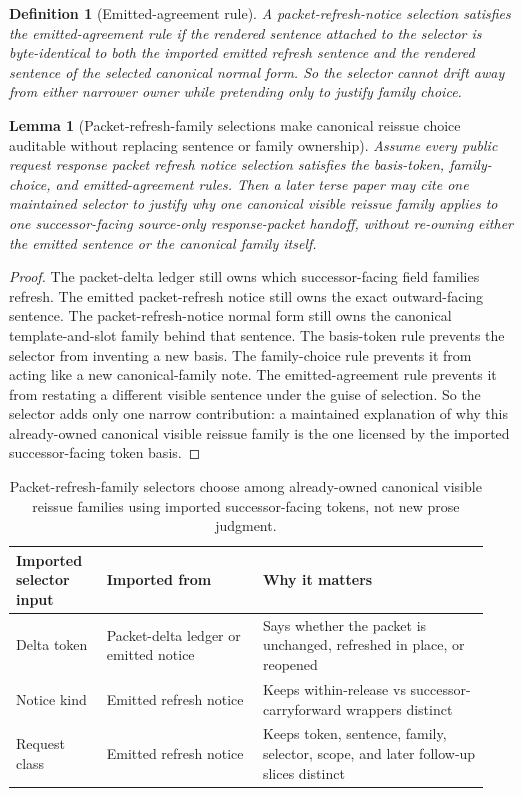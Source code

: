 \documentclass[11pt]{article}
\newtheorem{definition}{Definition}
\newtheorem{lemma}{Lemma}
\begin{document}
\begin{definition}[Emitted-agreement rule]
A packet-refresh-notice selection satisfies the \emph{emitted-agreement rule} if the rendered sentence attached to the selector is byte-identical to both the imported emitted refresh sentence and the rendered sentence of the selected canonical normal form. So the selector cannot drift away from either narrower owner while pretending only to justify family choice.
\end{definition}

\begin{lemma}[Packet-refresh-family selections make canonical reissue choice auditable without replacing sentence or family ownership]
Assume every public request response packet refresh notice selection satisfies the basis-token, family-choice, and emitted-agreement rules. Then a later terse paper may cite one maintained selector to justify why one canonical visible reissue family applies to one successor-facing source-only response-packet handoff, without re-owning either the emitted sentence or the canonical family itself.
\end{lemma}

\begin{proof}
The packet-delta ledger still owns which successor-facing field families refresh. The emitted packet-refresh notice still owns the exact outward-facing sentence. The packet-refresh-notice normal form still owns the canonical template-and-slot family behind that sentence. The basis-token rule prevents the selector from inventing a new basis. The family-choice rule prevents it from acting like a new canonical-family note. The emitted-agreement rule prevents it from restating a different visible sentence under the guise of selection. So the selector adds only one narrow contribution: a maintained explanation of why this already-owned canonical visible reissue family is the one licensed by the imported successor-facing token basis.\qedhere
\end{proof}

\begin{table}[t]
\centering
\small
\begin{tabularx}{\linewidth}{@{}p{0.18\linewidth} p{0.31\linewidth} p{0.45\linewidth}@{}}
\toprule
Imported selector input & Imported from & Why it matters \\
\midrule
Delta token & Packet-delta ledger or emitted notice & Says whether the packet is unchanged, refreshed in place, or reopened \\
Notice kind & Emitted refresh notice & Keeps within-release vs successor-carryforward wrappers distinct \\
Request class & Emitted refresh notice & Keeps token, sentence, family, selector, scope, and later follow-up slices distinct \\
\bottomrule
\end{tabularx}
\caption{Packet-refresh-family selectors choose among already-owned canonical visible reissue families using imported successor-facing tokens, not new prose judgment.}
\label{tab:publicrequestresponsepacketrefreshnoticeselections}
\end{table}
\end{document}
